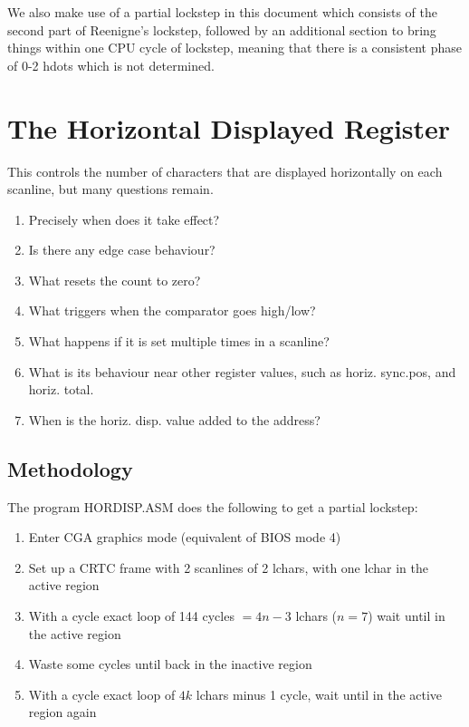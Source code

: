 \documentclass[a4paper,10pt]{amsart}
\begin{document}
We also make use of a partial lockstep in this document which consists of the
second part of Reenigne's lockstep, followed by an additional section to bring
things within one CPU cycle of lockstep, meaning that there is a consistent
phase of 0-2 hdots which is not determined.

\section{The Horizontal Displayed Register}

This controls the number of characters that are displayed horizontally on each
scanline, but many questions remain.

\begin{enumerate}
\item Precisely when does it take effect?
\item Is there any edge case behaviour?
\item What resets the count to zero?
\item What triggers when the comparator goes high/low?
\item What happens if it is set multiple times in a scanline?
\item What is its behaviour near other register values, such as horiz. sync.pos,
      and horiz. total.
\item When is the horiz. disp. value added to the address?
\end{enumerate}

\subsection{Methodology}

The program HORDISP.ASM does the following to get a partial lockstep:

\begin{enumerate}
\item Enter CGA graphics mode (equivalent of BIOS mode 4)
\item Set up a CRTC frame with 2 scanlines of 2 lchars, with one lchar in the active region
\item With a cycle exact loop of 144 cycles $= 4n-3$ lchars ($n = 7$) wait until in the active region
\item Waste some cycles until back in the inactive region
\item With a cycle exact loop of $4k$ lchars minus 1 cycle, wait until in the active region again
\end{enumerate}
\end{document}
